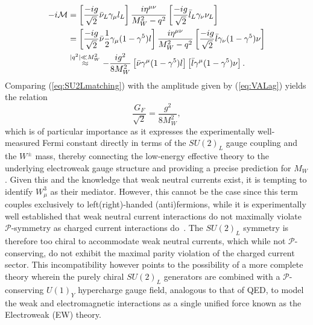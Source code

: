 \begin{align}
-i\mathcal{M} &= \left[\frac{-ig}{\sqrt{2}}\bar{\nu}_L\gamma_\mu l_L\right]\frac{i\eta^{\mu\nu}}{M_W^2 - q^2}\left[\frac{-ig}{\sqrt{2}}\bar{l}_L\gamma_\nu\nu_L\right] \\ \nonumber &= \left[\frac{-ig}{\sqrt{2}}\bar{\nu}\frac{1}{2}\gamma_\mu(1-\gamma^5)l\right]\frac{i\eta^{\mu\nu}}{M_W^2 - q^2}\left[\frac{-ig}{\sqrt{2}}\bar{l}\gamma_\nu(1-\gamma^5)\nu\right] \\ \label{eq:SU2Lmatching} &\stackrel{\footnotesize|q^2|\ll M_W^2}{\approx} -\frac{ig^2}{8M_W^2}\left[\bar{\nu}\gamma^\mu(1-\gamma^5)l\right]\left[\bar{l}\gamma^\mu(1-\gamma^5)\nu\right].
\end{align}
Comparing (\ref{eq:SU2Lmatching}) with the amplitude given by (\ref{eq:VALag}) yields the relation
\begin{equation}\label{eq:GF_matching}
\frac{G_F}{\sqrt{2}} = \frac{g^2}{8M_W^2},
\end{equation}
which is of particular importance as it expresses the experimentally well-measured Fermi constant directly in terms of the $SU(2)_L$ gauge coupling and the $W^\pm$ mass, thereby connecting the low-energy effective theory to the underlying electroweak gauge structure and providing a precise prediction for $M_W$. Given this and the knowledge that weak neutral currents exist, it is tempting to identify $W^3_\mu$ as their mediator. However, this cannot be the case since this term couples exclusively to left(right)-handed (anti)fermions, while it is experimentally well established that weak neutral current interactions do not maximally violate $\mathcal{P}$-symmetry as charged current interactions do~\cite{Hasert1973a, Hasert1973b}. The $SU(2)_L$ symmetry is therefore too chiral to accommodate weak neutral currents, which while not $\mathcal{P}$-conserving, do not exhibit the maximal parity violation of the charged current sector. This incompatibility however points to the possibility of a more complete theory wherein the purely chiral $SU(2)_L$ generators are combined with a $\mathcal{P}$-conserving $U(1)_Y$ hypercharge gauge field, analogous to that of QED, to model the weak and electromagnetic interactions as a single unified force known as the Electroweak (EW) theory.
